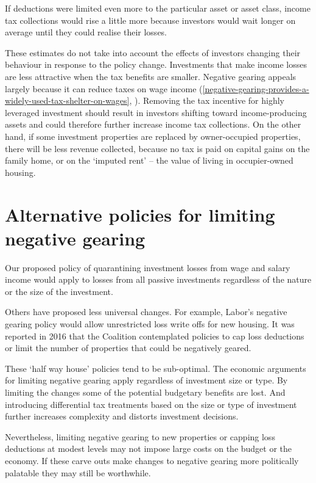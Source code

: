 \documentclass{grattan}\usepackage[]{graphicx}\usepackage[]{color}
\begin{document}
If deductions were limited even more to the particular asset or asset class, income tax collections would rise a little more because investors would wait longer on average until they could realise their losses. 

These estimates do not take into account the effects of investors changing their behaviour in response to the policy change. Investments that make income losses are less attractive when the tax benefits are smaller. Negative gearing appeals largely because it can reduce taxes on wage income (\cref{negative-gearing-provides-a-widely-used-tax-shelter-on-wages}, ). Removing the tax incentive for highly leveraged investment should result in investors shifting toward income-producing assets and could therefore further increase income tax collections. On the other hand, if some investment properties are replaced by owner-occupied properties, there will be less revenue collected, because no tax is paid on capital gains on the family home, or on the `imputed rent' -- the value of living in occupier-owned housing.

\section{Alternative policies for limiting negative gearing}
Our proposed policy of quarantining investment losses from wage and salary income would apply to losses from all passive investments regardless of the nature or the size of the investment. 

Others have proposed less universal changes. For example, Labor's negative gearing policy would allow unrestricted loss write offs for new housing.  It was reported in 2016 that the Coalition contemplated policies to cap loss deductions or limit the number of properties that could be negatively geared. 

These `half way house' policies tend to be sub-optimal. The economic arguments for limiting negative gearing apply regardless of investment size or type. By limiting the changes some of the potential budgetary benefits are lost. And introducing differential tax treatments based on the size or type of investment further increases complexity and distorts investment decisions. 

Nevertheless, limiting negative gearing to new properties or capping loss deductions at modest levels may not impose large costs on the budget or the economy. If these carve outs make changes to negative gearing more politically palatable they may still be worthwhile.
\end{document}
